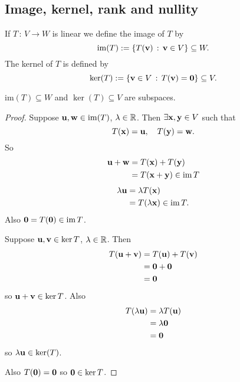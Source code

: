 \documentclass[10pt, a4paper]{article}
\begin{document}
\subsection{Image, kernel, rank and nullity}
\begin{definition}
    If $T\,:\, V \rightarrow W$ is linear we define the image of $T$ by
    \[
    \mathrm{im}(T) := \{T(\mathbf{v})\,:\,\mathbf{v} \in V\} \subseteq W.
    \]
    The kernel of $T$ is defined by
    \[
    \ker(T) := \{\mathbf{v} \in V\,:\,T(\mathbf{v}) = \mathbf{0}\} \subseteq V.
    \]
\end{definition}

\begin{proposition}
    $\mathrm{im}(T) \subseteq W$ and $\ker(T) \subseteq V$ are subspaces.
    \begin{proof}
        Suppose $\mathbf{u, w} \in \mathrm{im}(T)$,
        $\lambda \in \mathbb{R}$.
        Then $\exists \mathbf{x, y} \in V$ such that
        \[
        T(\mathbf{x}) = \mathbf{u},\quad T(\mathbf{y}) = \mathbf{w}.
        \]
        So
        \begin{align*}
            \mathbf{u} + \mathbf{w} &= T(\mathbf{x}) + T(\mathbf{y}) \\
            &= T(\mathbf{x} + \mathbf{y}) \in \operatorname{im}{T}
        \end{align*}
        \begin{align*}
            \lambda\mathbf{u} &= \lambda T(\mathbf{x}) \\
            &= T(\lambda\mathbf{x}) \in \operatorname{im}{T}.
        \end{align*}
        Also $\mathbf{0} = T(\mathbf{0}) \in \operatorname{im}{T}$.

        Suppose $\mathbf{u, v} \in \ker{T}$,
        $\lambda \in \mathbb{R}$.
        Then
        \begin{align*}
            T(\mathbf{u} + \mathbf{v}) &= T(\mathbf{u}) + T(\mathbf{v}) \\
            &= \mathbf{0} + \mathbf{0} \\
            &= \mathbf{0}
        \end{align*}
        so $\mathbf{u + v} \in \ker{T}$.
        Also
        \begin{align*}
            T(\lambda\mathbf{u}) &= \lambda T(\mathbf{u}) \\
            &= \lambda\mathbf{0} \\
            &= \mathbf{0}
        \end{align*}
        so $\lambda\mathbf{u} \in \ker(T)$.

        Also $T(\mathbf{0}) = \mathbf{0}$ so $\mathbf{0} \in \ker{T}$.
    \end{proof}
\end{proposition}
\end{document}
